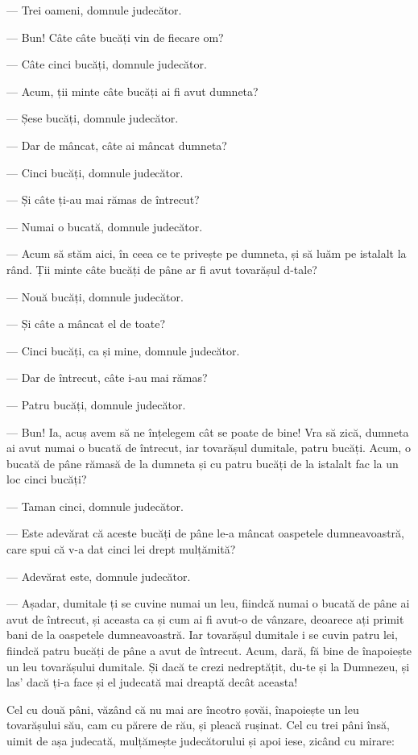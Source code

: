 \documentclass[12pt, a4paper, oneside, romanian]{teza-upb}
\begin{document}
— Trei oameni, domnule judecător.

— Bun! Câte câte bucăți vin de fiecare om?

— Câte cinci bucăți, domnule judecător.

— Acum, ții minte câte bucăți ai fi avut dumneta?

— Șese bucăți, domnule judecător.

— Dar de mâncat, câte ai mâncat dumneta?

— Cinci bucăți, domnule judecător.

— Și câte ți-au mai rămas de întrecut?

— Numai o bucată, domnule judecător.

— Acum să stăm aici, în ceea ce te privește pe dumneta, și să luăm pe istalalt la rând. Ții minte câte bucăți de pâne ar fi avut tovarășul d-tale?

— Nouă bucăți, domnule judecător.

— Și câte a mâncat el de toate?

— Cinci bucăți, ca și mine, domnule judecător.

— Dar de întrecut, câte i-au mai rămas?

— Patru bucăți, domnule judecător.

— Bun! Ia, acuș avem să ne înțelegem cât se poate de bine! Vra să zică, dumneta ai avut numai o bucată de întrecut, iar tovarășul dumitale, patru bucăți. Acum, o bucată de pâne rămasă de la dumneta și cu patru bucăți de la istalalt fac la un loc cinci bucăți?

— Taman cinci, domnule judecător.

— Este adevărat că aceste bucăți de pâne le-a mâncat oaspetele dumneavoastră, care spui că v-a dat cinci lei drept mulțămită?

— Adevărat este, domnule judecător.

— Așadar, dumitale ți se cuvine numai un leu, fiindcă numai o bucată de pâne ai avut de întrecut, și aceasta ca și cum ai fi avut-o de vânzare, deoarece ați 
primit bani de la oaspetele dumneavoastră. Iar tovarășul dumitale i se cuvin patru lei, fiindcă patru bucăți de pâne a avut de întrecut. Acum, dară, fă bine de înapoiește un leu tovarășului dumitale. Și dacă te crezi nedreptățit, du-te și la Dumnezeu, și las' dacă ți-a face și el judecată mai dreaptă decât aceasta!

Cel cu două pâni, văzând că nu mai are încotro șovăi, înapoiește un leu tovarășului său, cam cu părere de rău, și pleacă rușinat. Cel cu trei pâni însă, uimit de așa judecată, mulțămește judecătorului și apoi iese, zicând cu mirare:
\end{document}
